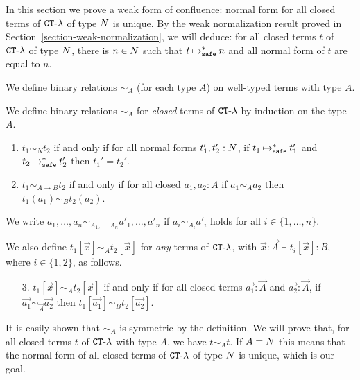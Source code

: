 In this section we prove a weak form of confluence: normal form for
all closed terms of ${ {\tt CT} \mbox{-} \lambda}$ of type ${N}$ is unique.
By the weak normalization result proved in Section~\ref{section-weak-normalization},
we will deduce: for all closed terms $t$ of ${ {\tt CT} \mbox{-} \lambda}$ of type ${N}$,
there is $n \in {N}$ such that $t \mathbin{\mathbin{\mapsto}_{\hbox{\scriptsize \tt safe}}^*} n$
and all normal form of $t$ are equal to $n$. 

We define binary relations $\sim_A$ (for each type $A$) on well-typed terms with type $A$.
\begin{definition}
  We define binary relations $\sim_A$ for \emph{closed} terms of ${ {\tt CT} \mbox{-} \lambda}$
  by induction on the type $A$. 
  \begin{enumerate}
  \item
    $t_1 \sim_N t_2$ if and only if for all normal forms $t_1',t_2':{N}$, if $t_1 \mathbin{\mathbin{\mapsto}_{\hbox{\scriptsize \tt safe}}^*} t_1'$
    and $t_2 \mathbin{\mathbin{\mapsto}_{\hbox{\scriptsize \tt safe}}^*} t_2'$ then $t_1' = t_2'$.
  \item
    $t_1 \sim_{A\rightarrow B} t_2$ if and only if for all closed $a_1,a_2:A$ if
    $a_1 \sim_A a_2$ then $t_1(a_1) \sim_B t_2(a_2)$.
  \end{enumerate}
  We write $a_1,\ldots,a_n \sim_{A_1,\ldots,A_n} a'_1,\ldots,a'_n$ if $a_i\sim_{A_i} a'_i$ holds
  for all $i\in\{1,\ldots,n\}$. 
  
  We also define $t_1[\vec{x}] \sim_A t_2[\vec{x}]$ for \emph{any} terms of ${ {\tt CT} \mbox{-} \lambda}$,
  with $\vec{x}:\vec{A}\vdash t_i[\vec{x}]:B$, where $i\in\{1,2\}$, as follows. 
  \begin{enumerate}
  \item[3.]
    $t_1[\vec{x}] \sim_A t_2[\vec{x}]$ if and only if
    for all closed terms $\vec{a_1}:\vec{A}$ and $\vec{a_2}:\vec{A}$,
    if $\vec{a_1}\sim_{\vec{A}}\vec{a_2}$ then $t_1[\vec{a_1}] \sim_B t_2[\vec{a_2}]$. 
  \end{enumerate}  
  
\end{definition}

It is easily shown that $\sim_A$ is symmetric by the definition. 
We will prove that, for all closed terms $t$ of ${ {\tt CT} \mbox{-} \lambda}$ with type $A$, we have $t \sim_A t$.
If $A={N}$ this means that the normal form of all closed terms of ${ {\tt CT} \mbox{-} \lambda}$ of type ${N}$ is unique,
which is our goal.

